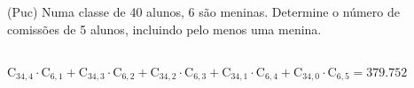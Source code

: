 \begin{ex}
(Puc) Numa classe de 40 alunos, 6 são meninas. Determine o número de comissões de 5 alunos, incluindo pelo menos uma menina.
 \begin{sol}
  \phantom{A} \\
  $\mathrm{C}_{{34},4}\cdot\mathrm{C}_{6,1}+\mathrm{C}_{{34},3}\cdot\mathrm{C}_{6,2}+\mathrm{C}_{{34},2}\cdot\mathrm{C}_{6,3}+\mathrm{C}_{{34},1}\cdot\mathrm{C}_{6,4}+\mathrm{C}_{{34},0}\cdot\mathrm{C}_{6,5}=379.752$
 \end{sol}
\end{ex}